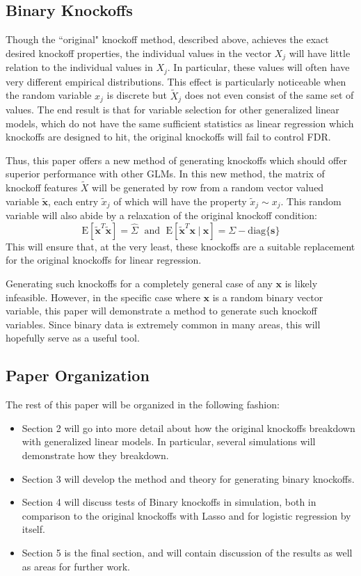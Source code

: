\documentclass[11pt]{article}
\newcommand{\E}{\mathrm{E}}
\newcommand{\diag}[1]{\mathrm{diag}\{#1\}}
\newcommand{\st}{ \; \big | \:}
\theoremstyle{definition}
\begin{document}
\subsection{Binary Knockoffs}
    Though the ``original" knockoff method, described above, achieves the exact desired knockoff properties, the individual values in the vector $X_j$ will have little relation to the individual values in $X_j$. In particular, these values will often have very different empirical distributions. This effect is particularly noticeable when the random variable $x_j$ is discrete but $\tilde X_j$ does not even consist of the same set of values. The end result is that for variable selection for other generalized linear models, which do not have the same sufficient statistics as linear regression which knockoffs are designed to hit, the original knockoffs will fail to control FDR. \par
    Thus, this paper offers a new method of generating knockoffs which should offer superior performance with other GLMs. In this new method, the matrix of knockoff features $\tilde X$ will be generated by row from a random vector valued variable $\mathbf{\tilde x}$, each entry $\tilde x_j$ of which will have the property $\tilde x_j \sim x_j$. This random variable will also abide by a relaxation of the original knockoff condition:
    \[ \E[\mathbf{\tilde x}^T\mathbf{\tilde x}]=\hat\Sigma \; \textrm{ and } \; \E[\mathbf{\tilde x}^T \mathbf x \st \mathbf x] = \Sigma - \diag{\mathbf s}\]
    This will ensure that, at the very least, these knockoffs are a suitable replacement for the original knockoffs for linear regression. \par
    Generating such knockoffs for a completely general case of any $\mathbf x$ is likely infeasible. However, in the specific case where $\mathbf x$ is a random binary vector variable, this paper will demonstrate a method to generate such knockoff variables. Since binary data is extremely common in many areas, this will hopefully serve as a useful tool.

\subsection{Paper Organization}
The rest of this paper will be organized in the following fashion:
\begin{itemize}
    \item Section 2 will go into more detail about how the original knockoffs breakdown with generalized linear models. In particular, several simulations will demonstrate how they breakdown.
    \item Section 3 will develop the method and theory for generating binary knockoffs.
    \item Section 4 will discuss tests of Binary knockoffs in simulation, both in comparison to the original knockoffs with Lasso and for logistic regression by itself.
    \item Section 5 is the final section, and will contain discussion of the results as well as areas for further work.
\end{itemize}
\end{document}
